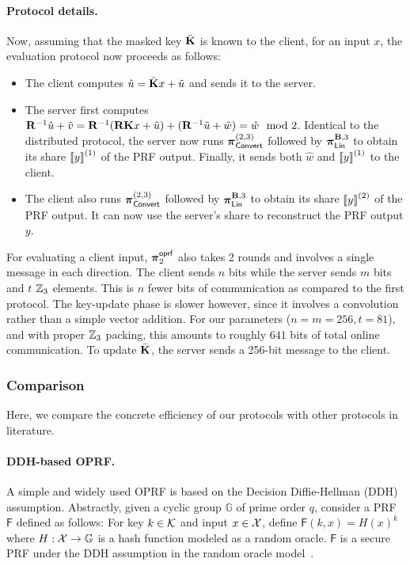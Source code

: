 \paragraph{Protocol details.} Now, assuming that the masked key $\bar{\mat{K}}$ is known to the client, for an input $x$,  the evaluation protocol now proceeds as follows:
\begin{itemize}
  \item The client computes $\hat{u} = \bar{\mat{K}}x + \tilde{u}$ and sends it to the server.

  \item The server first computes $\mat{R}^{-1}\hat{u} + \tilde{v} = \mat{R}^{-1}(\mat{R}\mat{K}x + \tilde{u}) + (\mat{R}^{-1}\tilde{u} + \tilde{w}) = \hat{w} \mod 2$. Identical to the distributed protocol, the server now runs $\boldsymbol{\pi}_{\textnormal{\textsf{Convert}}}^{(2,3)}$ followed by $\prot_\LMap^{\mat{B},3}$ to obtain its share $\left\llbracket y \right\rrbracket^{(1)}$ of the PRF output. Finally, it sends both $\hat{w}$ and $\left\llbracket y \right\rrbracket^{(1)}$ to the client.

  \item The client also runs $\boldsymbol{\pi}_{\textnormal{\textsf{Convert}}}^{(2,3)}$ followed by $\prot_\LMap^{\mat{B},3}$ to obtain its share $\left\llbracket y \right\rrbracket^{(2)}$ of the PRF output. It can now use the server's share to reconstruct the PRF output $y$.
\end{itemize}
For evaluating a client input, $\boldsymbol{\pi}^{\textsf{oprf}}_2$ also takes 2 rounds and involves a single message in each direction. The client sends $n$ bits while the server sends $m$ bits and $t$ $\mathbb{Z}_3$ elements. This is $n$ fewer bits of communication as compared to the first protocol. The key-update phase is slower however, since it involves a convolution rather than a simple vector addition. For our parameters ($n=m=256, t=81$), and with proper $\mathbb{Z}_3$ packing, this amounts to roughly $641$ bits of total online communication. To update $\bar{\mat{K}}$, the server sends a 256-bit message to the client.


\subsubsection{Comparison}
\label{subsec:oprf-comparison}
Here, we compare the concrete efficiency of our protocols with other protocols in literature.
\paragraph{DDH-based OPRF.}
A simple and widely used OPRF is based on the Decision Diffie-Hellman (DDH) assumption. Abstractly, given a cyclic group $\mathbb{G}$ of prime order $q$, consider a PRF $\mathsf{F}$ defined as follows: For key $k \in \mathcal{K}$ and input $x \in \mathcal{X}$, define $\mathsf{F}(k,x) = H(x)^k$ where $H:\mathcal{X} \to \mathbb{G}$ is a hash function modeled as a random oracle. $\mathsf{F}$ is a secure PRF under the DDH assumption in the random oracle model~\cite{naor1999-oprf}.

